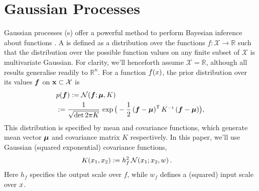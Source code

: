 \documentclass{article}
\begin{document}


\section{Gaussian Processes}
Gaussian processes (\gp s) offer a powerful method to perform Bayesian inference about functions \citep{GPsBook}. A \gpb is defined as a distribution over the functions $f: \mathcal{X} \rightarrow \mathbb{R}$ such that the distribution over the possible function values on any finite subset of $\mathcal{X}$ is multivariate Gaussian. For clarity, we'll henceforth assume $\mathcal{X} = \mathbb{R}$, although all results generalise readily to $\mathbb{R}^n$. For a function $f(\lfv)$, the prior distribution over its values $\vf$ on $\vlfv \subset \mathcal{X}$ is
\begin{align}%
\textstyle
 &\po{\vf}\deq \N{\vf}{\vmu}{K}\nonumber\\
 &\deq\frac{1}{\sqrt{\det{2\pi K}}}\,\exp \big(-\frac{1}{2}\,(\vf-\vmu)\tra\,K\inv\,(\vf-\vmu)\big),
\end{align}
This distribution is specified by mean and covariance functions, which generate mean vector $\vmu$ and covariance matrix $K$ respectively. 
In this paper, we'll use Gaussian (squared exponential) covariance functions,
\begin{align} \label{eq:Gaussian_cov_fn}
\textstyle
K(\lfv_1,\lfv_2)& \deq h_f^2\,\N{\lfv_1}{\lfv_2}{w}.
\end{align} 
Here $h_f$ specifies the output scale over $f$, while $w_f$ defines a (squared) input scale over $\lfv$. 
\end{document}
